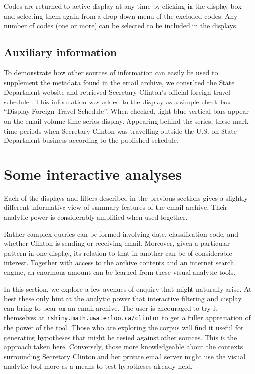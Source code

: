 \documentclass[journal]{vgtc}                %
\begin{document}
Codes are returned to active display at any time by clicking in the display box and selecting them again from a drop down menu of the excluded codes.  Any number of codes  (one or more) can be selected to be included in the displays.

\subsection{Auxiliary information}
To demonstrate how other sources of information can easily be used to supplement the metadata found in the email archive, we consulted the State Department website and retrieved Secretary Clinton's official foreign travel schedule  \cite{ForeignSched}.  This information was added to the display as a simple check box ``Display Foreign Travel Schedule''.  When checked, light blue vertical bars appear on the  email volume time series display.  Appearing behind the series, these mark time periods when Secretary Clinton was travelling outside the U.S. on State Department business according to the published schedule.

\section{Some interactive analyses}
\label{sect:Analysis}
Each of the displays and filters described in the previous sections gives a slightly different informative view of summary features of the email archive.  Their analytic power is considerably amplified when used together.  

Rather complex queries can be formed involving date, classification code, and whether Clinton is sending or receiving email.  Moreover, given a particular pattern in one display, its relation to that in another can be of considerable interest.   Together with access to the archive contents and an internet search engine, an enormous amount can be learned from these visual analytic tools.

In this section, we explore a few avenues of enquiry that might naturally arise.  At best these only hint at the analytic power that interactive filtering and display can bring to bear on an email archive.  The user is encouraged to try it themselves at \href{https://rshiny.math.uwaterloo.ca/clinton}{\color{blue} \texttt{rshiny.math.uwaterloo.ca/clinton} } to get a fuller appreciation of the power of the tool.  Those who are exploring the corpus will find it useful for generating hypotheses that might be tested against other sources.   This is the approach taken here.  Conversely, those more knowledgeable about the contexts surrounding Secretary Clinton and her private email server might use the visual analytic tool more as a means to test hypotheses already held.
\end{document}
